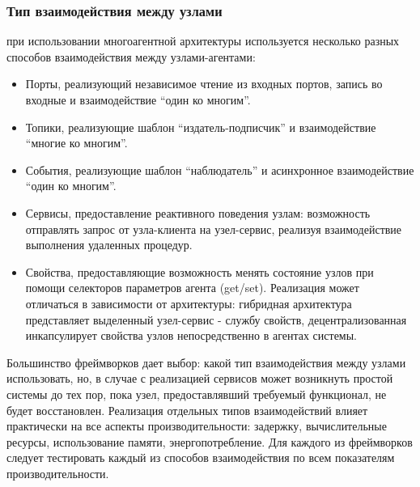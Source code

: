 \subsubsection{Тип взаимодействия между узлами} при использовании многоагентной архитектуры используется несколько разных способов взаимодействия между узлами-агентами:
\begin{itemize}
	\item Порты, реализующий независимое чтение из входных портов, запись во входные и взаимодействие \enquote{один ко многим}.
	\item Топики, реализующие шаблон \enquote{издатель-подписчик} и взаимодействие \enquote{многие ко многим}.
	\item События, реализующие шаблон \enquote{наблюдатель} и асинхронное взаимодействие \enquote{один ко многим}.
	\item Сервисы, предоставление реактивного поведения узлам: возможность отправлять запрос от узла-клиента на узел-сервис, реализуя взаимодействие выполнения удаленных процедур.
	\item Свойства, предоставляющие возможность менять состояние узлов при помощи селекторов параметров агента (get/set). Реализация может отличаться в зависимости от архитектуры: гибридная архитектура представляет выделенный узел-сервис - службу свойств, децентрализованная инкапсулирует свойства узлов непосредственно в агентах системы.
\end{itemize}

Большинство фреймворков дает выбор: какой тип взаимодействия между узлами использовать, но, в случае с реализацией сервисов может возникнуть простой системы до тех пор, пока узел, предоставлявший требуемый функционал, не будет восстановлен. Реализация отдельных типов взаимодействий влияет практически на все аспекты производительности: задержку, вычислительные ресурсы, использование памяти, энергопотребление. Для каждого из фреймворков следует тестировать каждый из способов взаимодействия по всем показателям производительности.

